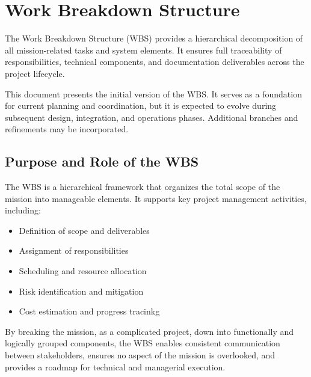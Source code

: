 \chapter{Work Breakdown Structure}
\label{chpt:WBS}

The Work Breakdown Structure (WBS) provides a hierarchical decomposition of all
mission-related tasks and system elements. It ensures full traceability of responsibilities, technical
components, and documentation deliverables across the project lifecycle. 

This document presents the initial version of the WBS. It serves as a foundation for current planning
and coordination, but it is expected to evolve during subsequent design, integration, and operations
phases. Additional branches and refinements may be incorporated.

\section{Purpose and Role of the WBS}

The WBS is a hierarchical framework that organizes the total scope
of the mission into manageable elements. It supports key project management activities, including:
\begin{itemize}
    \item Definition of scope and deliverables
    \item Assignment of responsibilities
    \item Scheduling and resource allocation
    \item Risk identification and mitigation
    \item Cost estimation and progress tracinkg    
\end{itemize}

By breaking the mission, as a complicated project, down into functionally and logically grouped components, the WBS enables consistent communication between stakeholders, ensures no aspect of the mission is overlooked, and provides a roadmap for technical and managerial execution.

